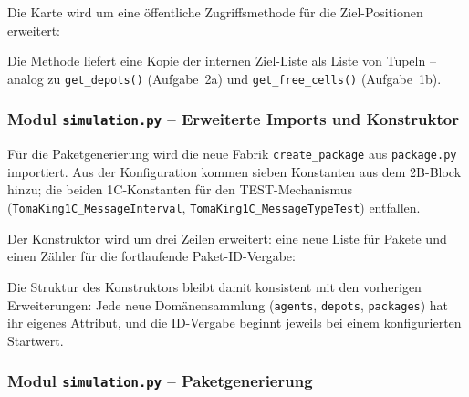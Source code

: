 Die Karte wird um eine öffentliche Zugriffsmethode für die Ziel-Positionen erweitert:



Die Methode liefert eine Kopie der internen Ziel-Liste als Liste von Tupeln -- analog zu \texttt{get\_depots()} (Aufgabe~2a) und \texttt{get\_free\_cells()} (Aufgabe~1b).


\subsubsection{Modul \texttt{simulation.py} – Erweiterte Imports und Konstruktor}

Für die Paketgenerierung wird die neue Fabrik \texttt{create\_package} aus \texttt{package.py} importiert. Aus der Konfiguration kommen sieben Konstanten aus dem 2B-Block hinzu; die beiden 1C-Konstanten für den TEST-Mechanismus (\texttt{TomaKing1C\_MessageInterval}, \texttt{TomaKing1C\_MessageTypeTest}) entfallen.



Der Konstruktor wird um drei Zeilen erweitert: eine neue Liste für Pakete und einen Zähler für die fortlaufende Paket-ID-Vergabe:



Die Struktur des Konstruktors bleibt damit konsistent mit den vorherigen Erweiterungen: Jede neue Domänensammlung (\texttt{agents}, \texttt{depots}, \texttt{packages}) hat ihr eigenes Attribut, und die ID-Vergabe beginnt jeweils bei einem konfigurierten Startwert.


\subsubsection{Modul \texttt{simulation.py} – Paketgenerierung}

